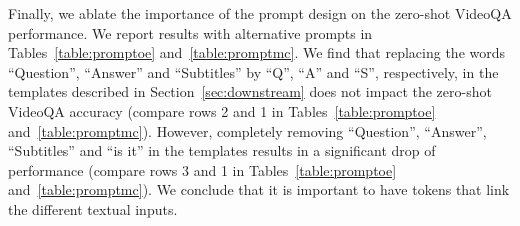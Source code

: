 Finally, we ablate the importance of the prompt design on the zero-shot VideoQA performance.
We report results with alternative prompts in Tables~\ref{table:promptoe} and~\ref{table:promptmc}.
We find that replacing the words “Question”, “Answer” and “Subtitles” by “Q”, “A” and “S”, respectively, in the templates described in Section~\ref{sec:downstream} does not impact the zero-shot VideoQA accuracy (compare rows 2 and 1 in Tables~\ref{table:promptoe} and~\ref{table:promptmc}).
However, completely removing “Question”, “Answer”, “Subtitles” and “is it” in the templates results in a significant drop of performance (compare rows 3 and 1 in Tables~\ref{table:promptoe} and~\ref{table:promptmc}). 
We conclude that it is important to have tokens that link the different textual inputs.

\begin{table}[!t]
\begin{center}
\setlength\tabcolsep{1pt}
 \vspace{+0.2cm}
\caption{\small Importance of cross-modal training and training various parameters for fully-supervised VideoQA.
All models are finetuned on downstream VideoQA datasets, and use multi-modal inputs (video, speech and question) at inference.}
\label{table:addsupervised}
\end{center}
\end{table}

